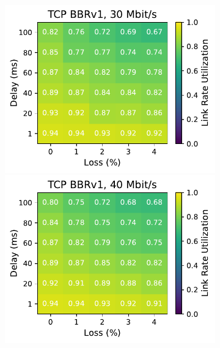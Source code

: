 \begin{figure}[ht]
\begin{subfigure}[b]{0.22\linewidth}
        \includegraphics[width=\linewidth,trim={0 0 2cm 0},clip]{splitting-paper/figures/heatmaps/heatmap_tcp_bbr1_30mbps.pdf}
        \includegraphics[width=\linewidth,trim={0 0 2cm 0},clip]{splitting-paper/figures/heatmaps/heatmap_tcp_bbr1_40mbps.pdf}

\end{subfigure}
\end{figure}
